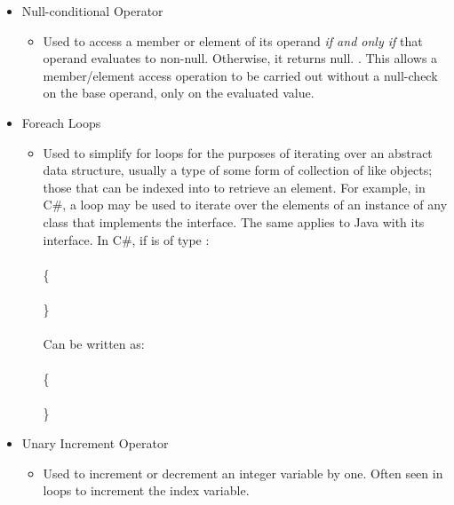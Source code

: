 \documentclass{article}
\begin{document}
\begin{itemize}
\begin{itemize}
                \end{itemize}
            \item Null-conditional Operator
                \begin{itemize}
                    \item Used to access a member or element of its operand \emph{if and only if} that operand evaluates to non-null. Otherwise, it returns null. \citep{cs6Spec}. This allows a member/element access operation to be carried out without a null-check on the base operand, only on the evaluated value.
                \end{itemize}
             \item Foreach Loops
                \begin{itemize}
                    \item Used to simplify for loops for the purposes of iterating over an abstract data structure, usually a type of some form of collection of like objects; those that can be indexed into to retrieve an element. For example, in C\#, a  loop may be used to iterate over the elements of an instance of any class that implements the  interface. The same applies to Java with its  interface. In C\#, if  is of type :
                    \\
                    \\
                    \{\\
                    \hspace*{1cm}\\
                    \}
                    \\\\
                    Can be written as:\\
                    \\
                    \{\\
                    \hspace*{1cm}\\
                    \}
                \end{itemize}
            \item Unary Increment Operator
                \begin{itemize}
                    \item Used to increment or decrement an integer variable by one. Often seen in  loops to increment the index variable.

\end{itemize}
\end{itemize}
\end{document}

